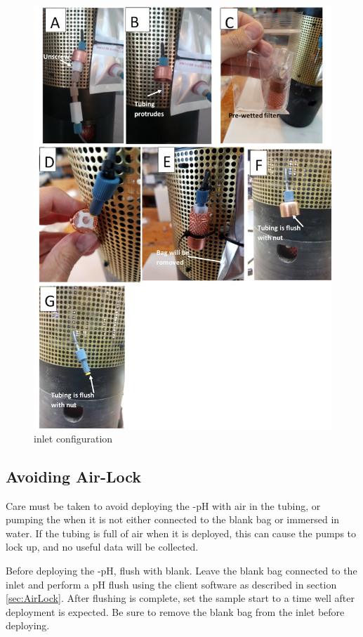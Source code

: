 \begin{figure}
\centering
\includegraphics[width=1.0\textwidth]{figs/Filter_Fig.png}
\caption{\instType{} inlet configuration}
\label{fig:FilterFig}
\end{figure}


\subsection{Avoiding Air-Lock}

Care must be taken to avoid deploying the \instType{}-pH with air in the tubing, or pumping the \instType{} when it is not either connected to the blank bag or immersed in water.  If the \instType{} tubing is full of air when it is deployed, this can cause the pumps to lock up, and no useful data will be collected.  

Before deploying the \instType{}-pH, flush with blank.  Leave the blank bag connected to the inlet and perform a pH flush using the \instType{} client software as described in section \ref{sec:AirLock}.  After flushing is complete, set the sample start to a time well after deployment is expected. Be sure to remove the blank bag from the inlet before deploying.

\fi